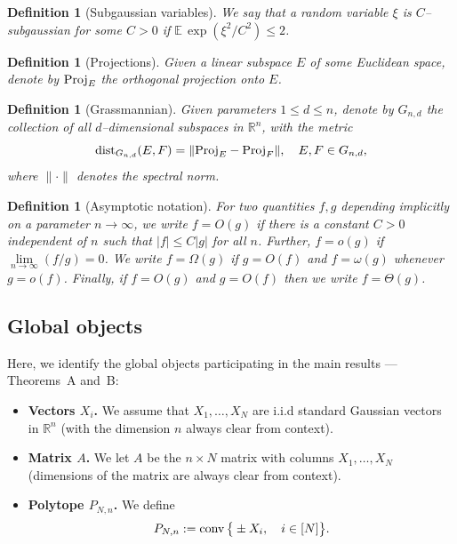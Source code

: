 \documentclass[11pt]{amsart}
\newtheorem{definition}[theorem]{Definition}
\theoremstyle{definition}
\theoremstyle{plain}
\newcommand{\R}{\mathbb{R}}
\def\R{{\mathbb R}}
\def\Exp{{\mathbb E}}
\def\Proj{{\rm Proj}}
\def\conv{{\rm conv}}
\begin{document}
\begin{definition}[Subgaussian variables]
We say that a random variable $\xi$ is {\it $C$--subgaussian}
for some $C>0$ 
if $\Exp\,\exp(\xi^2/C^2)\leq 2$.
\end{definition}

\begin{definition}[Projections]
Given a linear subspace $E$ of some Euclidean space,
denote by $\Proj_E$ the orthogonal projection onto $E$.
\end{definition}

\begin{definition}[Grassmannian]
Given parameters $1\leq d\leq n$, denote by
$G_{n,d}$ the collection of all $d$--dimensional subspaces
in $\R^n$, with the metric
$$
{\rm dist}_{G_{n,d}}(E,F)
=\|\Proj_E-\Proj_F\|,\quad E,F\in G_{n,d},
$$
where $\|\cdot\|$ denotes the spectral norm.
\end{definition}

\begin{definition}[Asymptotic notation]
For two quantities $f,g$ depending implicitly on a parameter $n\to\infty$,
we write $f=O(g)$ if there is a constant $C>0$ independent of $n$ such that
$|f|\leq C|g|$ for all $n$.
Further, $f=o(g)$ if $\lim\limits_{n\to\infty}(f/g)=0$.
We write $f=\Omega(g)$ if $g=O(f)$ and $f=\omega(g)$ whenever $g=o(f)$.
Finally, if $f=O(g)$ and $g=O(f)$ then we write $f=\Theta(g)$.
\end{definition}

\subsection{Global objects}

Here, we identify the global objects
participating in the main results --- Theorems~A and~B:

\begin{itemize}

\item {\bf Vectors $X_i$.}
We assume that $X_1,\dots,X_N$ are i.i.d standard Gaussian vectors 
in $\R^n$ (with the dimension $n$ always clear from context).

\item {\bf Matrix $A$.} We let $A$ be the $n\times N$ matrix with columns $X_1,\dots,X_N$
(dimensions of the matrix are always clear from context).

\item {\bf Polytope $P_{N,n}$.} We define
$$
P_{N,n}:=\conv\,\big\{
\pm X_i,\quad i\in[N]\big\}.
$$

\end{itemize}
\end{document}
